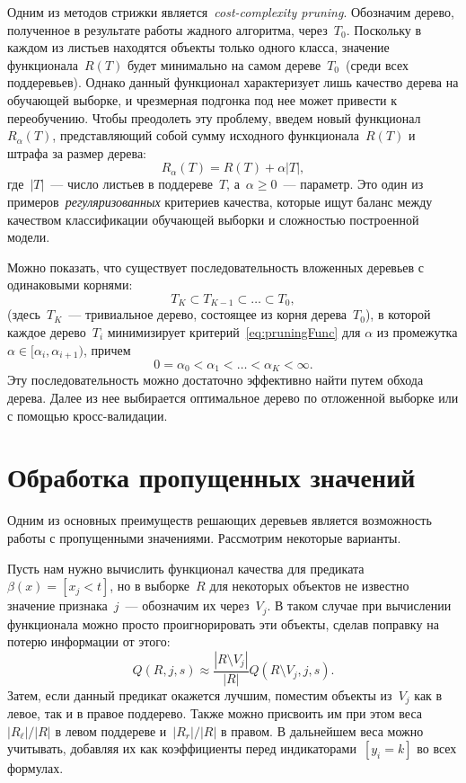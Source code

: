 \documentclass[12pt,fleqn]{article}
\begin{document}
Одним из методов стрижки является~\emph{cost-complexity pruning}.
Обозначим дерево, полученное в результате работы жадного алгоритма, через~$T_0$.
Поскольку в каждом из листьев находятся объекты только одного класса,
значение функционала~$R(T)$ будет минимально на самом дереве~$T_0$~(среди всех поддеревьев).
Однако данный функционал характеризует лишь качество дерева на обучающей выборке,
и чрезмерная подгонка под нее может привести к переобучению.
Чтобы преодолеть эту проблему, введем новый функционал~$R_\alpha(T)$,
представляющий собой сумму исходного функционала~$R(T)$ и штрафа за размер дерева:
\begin{equation}
\label{eq:pruningFunc}
    R_\alpha(T) = R(T) + \alpha |T|,
\end{equation}
где~$|T|$~--- число листьев в поддереве~$T$, а~$\alpha \geq 0$~--- параметр.
Это один из примеров~\emph{регуляризованных} критериев качества,
которые ищут баланс между качеством классификации обучающей выборки
и сложностью построенной модели.

Можно показать, что существует последовательность вложенных деревьев с одинаковыми корнями:
\[
    T_K \subset T_{K-1} \subset \dots \subset T_0,
\]
(здесь~$T_K$~--- тривиальное дерево, состоящее из корня дерева~$T_0$),
в которой каждое дерево~$T_i$ минимизирует критерий~\eqref{eq:pruningFunc}
для $\alpha$ из промежутка $\alpha \in [\alpha_i, \alpha_{i+1})$,
причем
\[
    0 = \alpha_0 < \alpha_1 < \dots < \alpha_K < \infty.
\]
Эту последовательность можно достаточно эффективно найти путем обхода дерева.
Далее из нее выбирается оптимальное дерево по отложенной выборке или с помощью кросс-валидации.

\section{Обработка пропущенных значений}
Одним из основных преимуществ решающих деревьев является возможность работы
с пропущенными значениями.
Рассмотрим некоторые варианты.

Пусть нам нужно вычислить функционал качества для предиката~$\beta(x) = [x_j < t]$,
но в выборке~$R$ для некоторых объектов не известно значение признака~$j$~---
обозначим их через~$V_{j}$.
В таком случае при вычислении функционала можно просто проигнорировать эти объекты,
сделав поправку на потерю информации от этого:
\[
    Q(R, j, s)
    \approx
    \frac{|R \setminus V_{j}|}{|R|}
    Q(R \setminus V_{j}, j, s).
\]
Затем, если данный предикат окажется лучшим, поместим объекты из~$V_{j}$
как в левое, так и в правое поддерево.
Также можно присвоить им при этом веса~$|R_\ell| / |R|$ в левом поддереве и~$|R_r| / |R|$ в правом.
В дальнейшем веса можно учитывать, добавляя их как коэффициенты перед индикаторами~$[y_i = k]$
во всех формулах.
\end{document}

